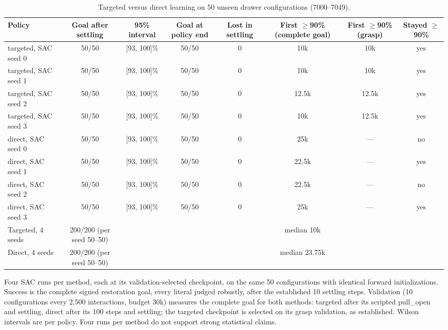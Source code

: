 \begin{table}[t]
\centering
\footnotesize
\caption{Targeted versus direct learning on 50 unseen drawer configurations (7000--7049).}
\label{tab:drawer-round2}
\begin{tabular}{@{}lccccccc@{}}
\toprule
Policy & Goal after settling & 95\% interval & Goal at policy end & Lost in settling & First $\geq$90\% (complete goal) & First $\geq$90\% (grasp) & Stayed $\geq$90\% \\
\midrule
targeted, SAC seed 0 & 50/50 & [93, 100]\% & 50/50 & 0 & 10k & 10k & yes \\
targeted, SAC seed 1 & 50/50 & [93, 100]\% & 50/50 & 0 & 10k & 10k & yes \\
targeted, SAC seed 2 & 50/50 & [93, 100]\% & 50/50 & 0 & 12.5k & 12.5k & yes \\
targeted, SAC seed 3 & 50/50 & [93, 100]\% & 50/50 & 0 & 10k & 12.5k & yes \\
direct, SAC seed 0 & 50/50 & [93, 100]\% & 50/50 & 0 & 25k & — & no \\
direct, SAC seed 1 & 50/50 & [93, 100]\% & 50/50 & 0 & 22.5k & — & yes \\
direct, SAC seed 2 & 50/50 & [93, 100]\% & 50/50 & 0 & 22.5k & — & no \\
direct, SAC seed 3 & 50/50 & [93, 100]\% & 50/50 & 0 & 25k & — & yes \\
\midrule Targeted, 4 seeds & 200/200 (per seed 50--50) & & & & median 10k & & \\
\midrule Direct, 4 seeds & 200/200 (per seed 50--50) & & & & median 23.75k & & \\
\bottomrule
\end{tabular}

\vspace{2pt}\parbox{\textwidth}{\scriptsize Four SAC runs per method, each at its validation-selected checkpoint, on the same 50 configurations with identical forward initializations. Success is the complete signed restoration goal, every literal judged robustly, after the established 10 settling steps. Validation (10 configurations every 2,500 interactions, budget 30k) measures the complete goal for both methods: targeted after its scripted pull_open and settling, direct after its 100 steps and settling; the targeted checkpoint is selected on its grasp validation, as established. Wilson intervals are per policy. Four runs per method do not support strong statistical claims.}
\end{table}
